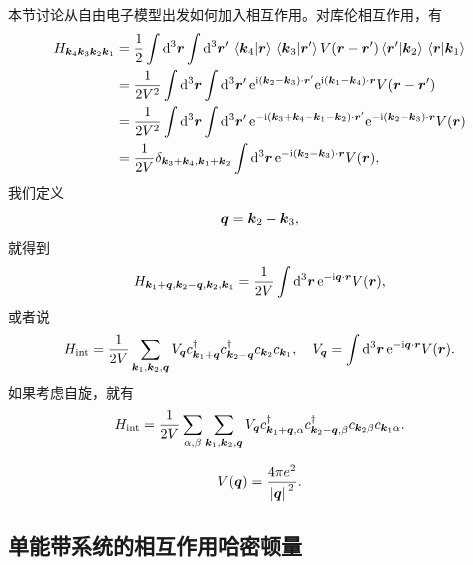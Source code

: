本节讨论从自由电子模型出发如何加入相互作用。对库伦相互作用，有
\[
    \begin{aligned}
        H_{\vb*{k}_4 \vb*{k}_3 \vb*{k}_2 \vb*{k}_1} &= \frac{1}{2} \int \dd[3]{\vb*{r}} \int \dd[3]{\vb*{r}'} \braket*{\vb*{k}_4}{\vb*{r}} \braket*{\vb*{k}_3}{\vb*{r}'} V(\vb*{r} - \vb*{r}') \braket*{\vb*{r}'}{\vb*{k}_2} \braket*{\vb*{r}}{\vb*{k}_1}  \\
        &= \frac{1}{2 V^2} \int \dd[3]{\vb*{r}} \int \dd[3]{\vb*{r}'} \mathrm{e}^{\mathrm{i} (\vb*{k}_2 - \vb*{k}_3) \cdot \vb*{r}'} \mathrm{e}^{\mathrm{i} (\vb*{k}_1 - \vb*{k}_4) \cdot \vb*{r}} V(\vb*{r} - \vb*{r}') \\
        &= \frac{1}{2V^2} \int \dd[3]{\vb*{r}} \int \dd[3]{\vb*{r}'} \mathrm{e}^{- \mathrm{i} (\vb*{k}_3 + \vb*{k}_4 - \vb*{k}_1 - \vb*{k}_2) \cdot \vb*{r}'} \mathrm{e}^{- \mathrm{i}(\vb*{k}_2 - \vb*{k}_3) \cdot \vb*{r}} V(\vb*{r}) \\
        &= \frac{1}{2V} \delta_{\vb*{k}_3 + \vb*{k}_4, \vb*{k}_1 + \vb*{k}_2} \int \dd[3]{\vb*{r}} \mathrm{e}^{- \mathrm{i} (\vb*{k}_2 - \vb*{k}_3) \cdot \vb*{r}} V(\vb*{r}),
    \end{aligned}
\]
我们定义
\[
    \vb*{q} = \vb*{k}_2 - \vb*{k}_3,
\]
就得到
\begin{equation}
    H_{\vb*{k}_1 + \vb*{q}, \vb*{k}_2 - \vb*{q}, \vb*{k}_2, \vb*{k}_1} = \frac{1}{2V} \int \dd[3]{\vb*{r}} \mathrm{e}^{- \mathrm{i} \vb*{q} \cdot \vb*{r}} V(\vb*{r}),
\end{equation}
或者说
\begin{equation}
    H_\text{int} = \frac{1}{2V} \sum_{\vb*{k}_1, \vb*{k}_2, \vb*{q}} V_{\vb*{q}} c^\dagger_{\vb*{k}_1 + \vb*{q}} c^\dagger_{\vb*{k}_2 - \vb*{q}} c_{\vb*{k}_2} c_{\vb*{k}_1} , \quad V_{\vb*{q}} = \int \dd[3]{\vb*{r}} \mathrm{e}^{- \mathrm{i} \vb*{q} \cdot \vb*{r}} V(\vb*{r}).
\end{equation}
如果考虑自旋，就有
\begin{equation}
    H_\text{int} = \frac{1}{2V} \sum_{\alpha, \beta} \sum_{\vb*{k}_1, \vb*{k}_2, \vb*{q}} V_{\vb*{q}} c^\dagger_{\vb*{k}_1 + \vb*{q}, \alpha} c^\dagger_{\vb*{k}_2 - \vb*{q}, \beta} c_{\vb*{k}_2 \beta} c_{\vb*{k}_1 \alpha}.
\end{equation}

\begin{equation}
    V(\vb*{q}) = \frac{4\pi e^2}{\abs*{\vb*{q}}^2}.
\end{equation}

\subsection{单能带系统的相互作用哈密顿量}

